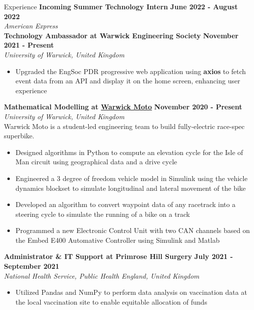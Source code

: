 \documentclass{resume}
\begin{document}
    \begin{rSection}{Experience}
        {\bf Incoming Summer Technology Intern} \hfill {\bf June 2022 - August 2022}\\
        {\em American Express }\\
        {\bf Technology Ambassador at Warwick Engineering Society} \hfill {\bf November 2021 - Present}\\
        {\em University of Warwick, United Kingdom}
        \begin{itemize}[nolistsep]
            \item Upgraded the EngSoc PDR progressive web application using {\bf axios} to fetch event data from an API and display it on the home screen, enhancing user experience
        \end{itemize}
        {\bf Mathematical Modelling at \href{https://warwick.ac.uk/fac/sci/wmg/education/undergraduate/student-projects/warwick-moto/}{Warwick Moto}} \hfill {\bf November 2020 - Present}\\
        {\em University of Warwick, United Kingdom}\\
        {Warwick Moto is a student-led engineering team to build fully-electric race-spec superbike.}
        \begin{itemize}[nolistsep]
            \item Designed algorithms in Python to compute an elevation cycle for the Isle of Man circuit using geographical data and a drive cycle
            \item Engineered a 3 degree of freedom vehicle model in Simulink using the vehicle dynamics blockset to simulate longitudinal and lateral movement of the bike
            \item Developed an algorithm to convert waypoint data of any racetrack into a steering cycle to simulate the running of a bike on a track
            \item Programmed a new Electronic Control Unit with two CAN channels based on the Embed E400 Automative Controller using Simulink and Matlab
        \end{itemize}  
        {\bf Administrator \& IT Support at Primrose Hill Surgery} \hfill {\bf July 2021 - September 2021}\\
        {\em National Health Service, Public Health England, United Kingdom}
        \begin{itemize}[nolistsep]
            \item Utilized Pandas and NumPy to perform data analysis on vaccination data at the local vaccination site to enable equitable allocation of funds

\end{itemize}
\end{rSection}
\end{document}
